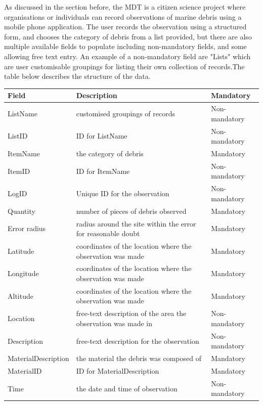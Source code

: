 \documentclass[10pt]{article}\usepackage[]{graphicx}\usepackage[]{color}
\begin{document}
As discussed in the section before, the MDT is a citizen science project where organisations or individuals can record observations of marine debris using a mobile phone application. \cite{JAMBECK2015B} The user records the observation using a structured form, and chooses the category of debris from a list provided, but there are also multiple available fields to populate including non-mandatory fields, and some allowing free text entry. An example of a non-mandatory field are "Lists"  which are user customisable groupings for listing their own collection of records.The table below describes the structure of the data. 

\begin{table}[H]
\begin{tabular}{ l l l }
Field & Description & Mandatory \\
\hline
ListName & customised groupings of records & Non-mandatory \\
ListID & ID for ListName & Non-mandatory \\
ItemName & the category of debris & Mandatory \\
ItemID & ID for ItemName & Non-mandatory \\
LogID & Unique ID for the observation & Non-mandatory \\
Quantity & number of pieces of debris observed & Mandatory \\
Error radius & radius around the site within the error for reasonable doubt & Mandatory \\
Latitude & coordinates of the location where the observation was made & Mandatory \\
Longitude & coordinates of the location where the observation was made & Mandatory \\
Altitude & coordinates of the location where the observation was made & Mandatory \\
Location & free-text description of the area the observation was made in & Non-mandatory \\
Description & free-text description for the observation & Non-mandatory \\
MaterialDescription & the material the debris was composed of & Mandatory \\
MaterialID & ID for MaterialDescription & Mandatory \\
Time & the date and time of observation & Non-mandatory \\
\end{tabular}
\end{table}
\end{document}
